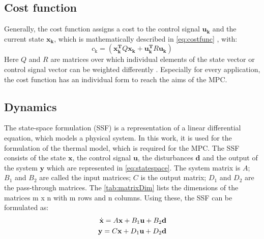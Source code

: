 \subsection{Cost function}
\label{subsection:costfunction}

    Generally, the cost function assigns a cost to the control signal $\mathbf{u_k}$ and the current state $\mathbf{x_k}$, which is mathematically described in
    \autoref{eq:costfunc}
    , with:
    \begin{equation}
    \label{eq:c_k}
    c_\text{k} = (\mathbf{x_k^T}Q\mathbf{x_k}+\mathbf{u_k^T}R\mathbf{u_k})
    \end{equation}
    Here $Q$ and $R$ are matrices over which individual elements of the state vector or control signal vector can be weighted differently \cite{Kouvaritakis.2016}.
    Especially for every application, the cost function has an individual form to reach the aims of the MPC.
    
\subsection{Dynamics}
\label{subsection:dynamics}
    
    The state-space formulation (SSF)  is a representation of a linear differential equation, which models a physical system. In this work, it is used for the formulation of the thermal model, which is required for the MPC. The SSF consists of the state $\textbf{x}$, the control signal $\textbf{u}$, the disturbances $\textbf{d}$ and the output of the system $\textbf{y}$ which are represented in \autoref{eq:statespace}. The system matrix is $A$; $B_\text{1}$ and $B_\text{2}$ are called the input matrices; $C$ is the output matrix; $D_\text{1}$ and $D_\text{2}$ are the pass-through matrices. The \autoref{tab:matrixDim} lists the dimensions of the matrices m x n with m rows and n columns. Using these, the SSF can be formulated as: 
    \begin{align}
    \label{eq:statespace}
    \dot{\textbf{x}}=A\textbf{x}+B_1\textbf{u}+B_2\textbf{d}\\
    \textbf{y}=C\textbf{x}+D_1\textbf{u}+D_2\textbf{d} \notag
    \end{align}
    

